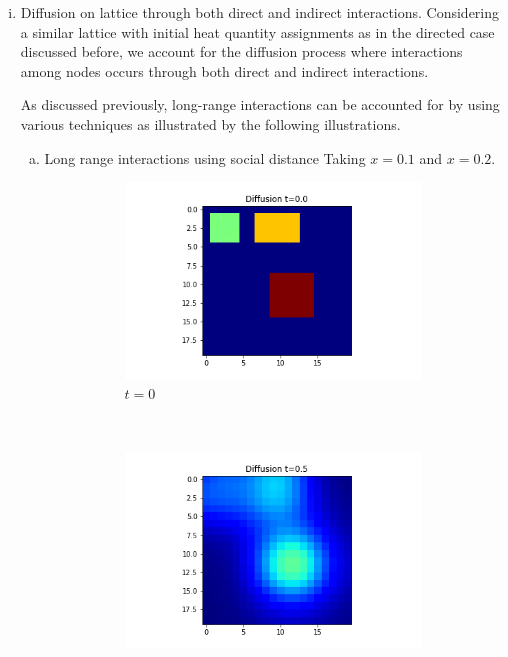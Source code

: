 \documentclass[10pt,a4paper]{article}
\begin{document}
\begin{enumerate}[i)]
         	\item Diffusion on lattice through both direct and indirect interactions.
         	Considering a similar lattice with initial heat quantity assignments as in the directed case discussed before, we account for the diffusion process where interactions among nodes occurs through both direct and indirect interactions.
         	
         	As discussed previously, long-range interactions can be accounted for by using various techniques as illustrated by the following illustrations.
         	\begin{enumerate}[a)]
         		\item Long range interactions using social distance 
         		Taking $x=0.1$ and $x=0.2$.
         		\begin{figure}[H]
         			\centering
         			\begin{subfigure}[b]{0.25\textwidth}
         				\includegraphics[width=\textwidth]{images/grid-t0-x01.png}
         				\caption{$t=0$}
         				\label{gridt0x01}
         			\end{subfigure}~
         			\begin{subfigure}[b]{0.25\textwidth}
         				\includegraphics[width= \textwidth]{images/grid-t05-x01.png}

\end{subfigure}
\end{figure}
\end{enumerate}
\end{enumerate}
\end{document}
